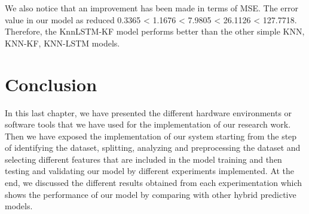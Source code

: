 We also notice that an improvement has been made in terms of MSE. The error value in our model as reduced 0.3365 < 1.1676 < 7.9805 < 26.1126 < 127.7718. Therefore, the KnnLSTM-KF model performs better than the other simple KNN, KNN-KF, KNN-LSTM models.

\pagebreak

\section{Conclusion}

In this last chapter, we have presented the different hardware environments or software tools that we have used for the implementation of our research work. Then we have exposed the implementation of our system starting from the step of identifying the dataset, splitting, analyzing and preprocessing the dataset and selecting different features that are included in the model training and then testing and validating our model by different experiments implemented. At the end, we discussed the different results obtained from each experimentation which shows the performance of our model by comparing with other hybrid predictive models.


